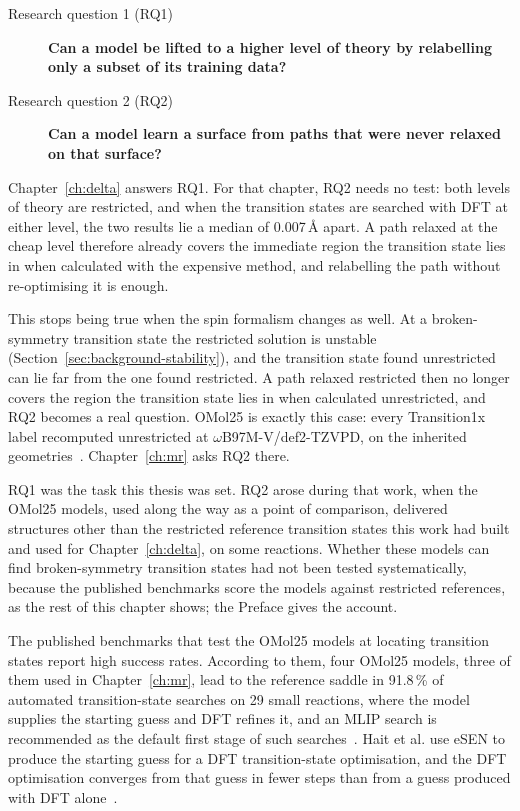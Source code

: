 \noindent
\begin{minipage}{\linewidth}
\begin{description}
  \item[Research question 1 (RQ1)] \textbf{Can a model be lifted to a higher
    level of theory by relabelling only a subset of its training data?}
  \item[Research question 2 (RQ2)] \textbf{Can a model learn a surface from
    paths that were never relaxed on that surface?}
\end{description}
\end{minipage}

Chapter~\ref{ch:delta} answers RQ1. For that chapter, RQ2 needs no
test: both levels of theory are restricted, and when the transition
states are searched with DFT at either level, the two results lie
a median of 0.007\,\AA{} apart. A path relaxed at the cheap level
therefore already covers the immediate region the transition state
lies in when calculated with the expensive method, and relabelling the
path without re-optimising it is enough.

This stops being true when the spin formalism changes as well. At a
broken-symmetry transition state the restricted solution is unstable
(Section~\ref{sec:background-stability}), and the transition state
found unrestricted can lie far from the one found restricted. A path
relaxed restricted then no longer covers the region the transition
state lies in when calculated unrestricted, and RQ2 becomes a real
question. OMol25 is exactly this case: every Transition1x label
recomputed unrestricted at \mbox{$\omega$B97M-V/def2-TZVPD}, on the
inherited geometries~\cite{omol25}. Chapter~\ref{ch:mr} asks RQ2 there.

RQ1 was the task this thesis was set. RQ2 arose during that work,
when the OMol25 models, used along the way as a point of comparison,
delivered structures other than the restricted reference transition
states this work had built and used for Chapter~\ref{ch:delta}, on
some reactions. Whether these models can find broken-symmetry
transition states had not been tested systematically, because the
published benchmarks score the models against restricted references,
as the rest of this chapter shows; the Preface gives the account.

The published benchmarks that test the OMol25 models at locating
transition states report high success rates. According to them, four
OMol25 models, three
of them used in Chapter~\ref{ch:mr}, lead to the reference saddle in 91.8\,\% of
automated transition-state searches on 29 small reactions, where the
model supplies the starting guess and DFT refines it, and an MLIP search
is recommended as the default first stage of such
searches~\cite{marks2026}. Hait et
al. use eSEN to produce the starting guess for a DFT transition-state
optimisation, and the DFT optimisation converges from that guess in
fewer steps than from a guess produced with DFT alone~\cite{hait2025}.

